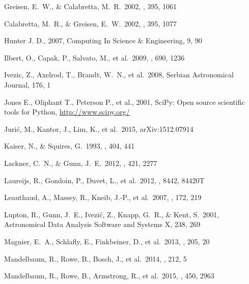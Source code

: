 \documentclass[useamsfonts]{pasj01}
\begin{document}
\begin{thebibliography}{}
     Greisen, E.~W., \& Calabretta, M.~R.\
             2002, \aap, 395, 1061

     Calabretta, M.~R., \& Greisen, E.~W.\
             2002, \aap, 395, 1077

     Hunter J. D., 2007, Computing In Science \&
             Engineering, 9, 90

     Ilbert, O., Capak, P., Salvato,
             M., et al.\ 2009, \apj, 690, 1236

     Ivezic, Z., Axelrod, T., Brandt, W.~N.,
             et al.\ 2008, Serbian Astronomical Journal, 176, 1

     Jones E., Oliphant T., Peterson P., et al.,
             2001, SciPy: Open source scientific tools for Python,
             \url{http://www.scipy.org/}

     Juri{\'c}, M., Kantor, J., Lim, K.,
             et al.\ 2015, arXiv:1512.07914

     Kaiser, N., \& Squires, G.\
             1993, \apj, 404, 441

     Lackner, C.~N., \& Gunn, J.~E.\
             2012, \mnras, 421, 2277

     Laureijs, R., Gondoin, P., Duvet, L.,
             et al.\ 2012, \procspie, 8442, 84420T

     Leauthaud, A., Massey, R.,
             Kneib, J.-P., et al.\ 2007, \apjs, 172, 219

     Lupton, R., Gunn, J.~E., Ivezi{\'c},
             Z., Knapp, G.~R., \& Kent, S.\ 2001, Astronomical Data Analysis Software
             and Systems X, 238, 269

    \bibitem[Magnier et al.(2013)]{Magnier2013} Magnier, E.~A., Schlafly, E.,
             Finkbeiner, D., et al.\ 2013, \apjs, 205, 20

     Mandelbaum, R., Rowe, B.,
            Bosch, J., et al.\ 2014, \apjs, 212, 5

     Mandelbaum, R., Rowe, B.,
             Armstrong, R., et al.\ 2015, \mnras, 450, 2963


\end{thebibliography}
\end{document}
